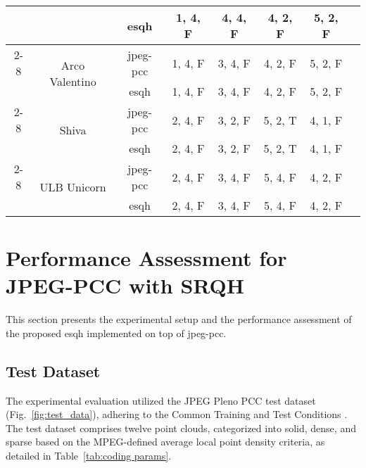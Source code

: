 \begin{table*}
\begin{tabular}{|c|c|c|c|c|c|c|c|}
    &  & \gls{esqh} & 1, 4, F & 4, 4, F & 4, 2, F& 5, 2, F & \\
    \cline{2-8}
    & \multirow{2}{*}{Arco Valentino} & \gls{jpeg-pcc} & 1, 4, F & 3, 4, F & 4, 2, F& 5, 2, F & \\
    &  & \gls{esqh} & 1, 4, F & 3, 4, F & 4, 2, F& 5, 2, F & \\
    \cline{2-8}
    & \multirow{2}{*}{Shiva} & \gls{jpeg-pcc} & 2, 4, F & 3, 2, F & 5, 2, T& 4, 1, F & \\
    &  & \gls{esqh} & 2, 4, F & 3, 2, F & 5, 2, T& 4, 1, F & \\
    \cline{2-8}
    & \multirow{2}{*}{ULB Unicorn} & \gls{jpeg-pcc} & 2, 4, F & 3, 4, F & 5, 4, F& 4, 2, F & \\
    &  & \gls{esqh} & 2, 4, F & 3, 4, F & 5, 4, F& 4, 2, F & \\
    \hline
    \end{tabular}
    \label{tab:coding params}
\end{table*}

\section{Performance Assessment for JPEG-PCC with SRQH}
\label{sec:rqulpe results}
This section presents the experimental setup and the performance assessment of the proposed \gls{esqh} implemented on top of \gls{jpeg-pcc}.
\subsection{Test Dataset}

The experimental evaluation utilized the JPEG Pleno PCC test dataset (Fig.~\ref{fig:test_data}), adhering to the Common Training and Test Conditions \cite{jpeg-pleno-cttc}. The test dataset comprises twelve point clouds, categorized into solid, dense, and sparse based on the MPEG-defined average local point density criteria, as detailed in Table~\ref{tab:coding params}.
